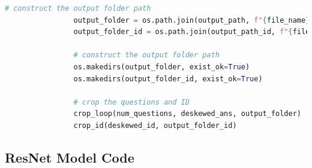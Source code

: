 \documentclass[twocolumn]{article}
\begin{document}
\begin{lstlisting}[language=Python, caption=crop\_pdf\_input.py]
                # construct the output folder path
                output_folder = os.path.join(output_path, f"{file_name}_page_{i+1}")
                output_folder_id = os.path.join(output_path_id, f"{file_name}_page_{i+1}")
                
                # construct the output folder path
                os.makedirs(output_folder, exist_ok=True)
                os.makedirs(output_folder_id, exist_ok=True)
                
                # crop the questions and ID
                crop_loop(num_questions, deskewed_ans, output_folder)
                crop_id(deskewed_id, output_folder_id)

\end{lstlisting}

\subsection{ResNet Model Code}
\end{document}

